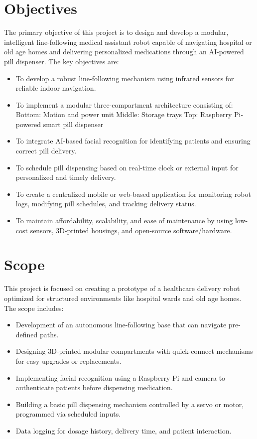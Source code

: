 \section{Objectives}
The primary objective of this project is to design and develop a modular, intelligent line-following medical assistant robot capable of navigating hospital or old age homes and delivering personalized medications through an AI-powered pill dispenser. The key objectives are:
\begin{itemize}
    
    \item To develop a robust line-following mechanism using infrared sensors for reliable indoor navigation.
    \item To implement a modular three-compartment architecture consisting of:
    \subitem Bottom: Motion and power unit
    \subitem Middle: Storage trays
    \subitem Top: Raspberry Pi-powered smart pill dispenser
    \item To integrate AI-based facial recognition for identifying patients and ensuring correct pill delivery.
    \item To schedule pill dispensing based on real-time clock or external input for personalized and timely delivery.
    \item To create a centralized mobile or web-based application for monitoring robot logs, modifying pill schedules, and tracking delivery status.
    \item To maintain affordability, scalability, and ease of maintenance by using low-cost sensors, 3D-printed housings, and open-source software/hardware.
\end{itemize}

\vspace{1.5\baselineskip} 

\section{Scope}
This project is focused on creating a prototype of a healthcare delivery robot optimized for structured environments like hospital wards and old age homes. The scope includes:
\begin{itemize}
    \item Development of an autonomous line-following base that can navigate pre-defined paths.
    \item Designing 3D-printed modular compartments with quick-connect mechanisms for easy upgrades or replacements.
    \item Implementing facial recognition using a Raspberry Pi and camera to authenticate patients before dispensing medication.
    \item Building a basic pill dispensing mechanism controlled by a servo or motor, programmed via scheduled inputs.
    \item Data logging for dosage history, delivery time, and patient interaction.
\end{itemize}
\vspace{1.5\baselineskip}

